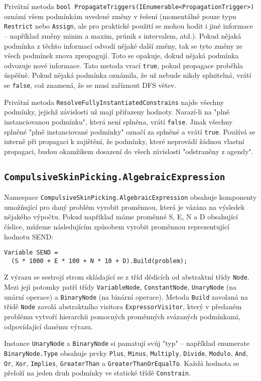 \documentclass[a4paper]{article}
\begin{document}
Privátní metoda \texttt{bool PropagateTriggers(IEnumerable<PropagationTrigger>)}
oznámí všem podmínkám uvedené změny v řešení (momentálně pouze typu
\texttt{Restrict} nebo \texttt{Assign}, ale pro praktické použití se mohou hodit
i jiné informace -- například změny minim a maxim, průnik s intervalem, atd.).
Pokud nějaká podmínka z těchto informací odvodí nějaké další změny, tak se tyto
změny ze všech podmínek znova zpropagují. Toto se opakuje, dokud nějaká podmínka
odvozuje nové informace.
Tato metoda vrací \texttt{true}, pokud propagace proběhla úspěšně. Pokud nějaká
podmínka oznámila, že už nebude nikdy splnitelná, vrátí se \texttt{false}, což
znamená, že se musí zaříznout DFS větev.

Privátní metoda \texttt{ResolveFullyInstantiatedConstrains} najde všechny
podmínky, jejichž závislosti už mají přiřazeny hodnoty. Narazí-li na "plně
instanciovanou podmínku", která není splněna, vrátí \texttt{false}. Jinak všechny
splněné "plně instanciované podmínky" označí za splněné a vrátí \texttt{true}.
Používá se interně při propagaci k zajištění, že podmínky, které neprovádí
žádnou vlastní propagaci, budou okamžikem dosazení do všech závislostí
"odstraněny z agendy".

\subsection{\texttt{CompulsiveSkinPicking.AlgebraicExpression}}
Namespace \texttt{CompulsiveSkinPicking.AlgebraicExpression} obsahuje komponenty
umožňující pro daný problém vyrobit proměnnou, která je vázána na výsledek
nějakého výpočtu.
Pokud například máme proměnné S, E, N a D obsahující číslice, můžeme
následujícím způsobem vyrobit proměnnou reprezentující hodnotu SEND:
\begin{lstlisting}
Variable SEND =
  (S * 1000 + E * 100 + N * 10 + D).Build(problem);
\end{lstlisting}

Z výrazu se sestrojí strom skládající se z tříd dědících od abstraktní třídy
\texttt{Node}. Mezi její potomky patří třídy \texttt{VariableNode},
\texttt{ConstantNode}, \texttt{UnaryNode} (na unární operace) a
\texttt{BinaryNode} (na binární operace). Metoda \texttt{Build} zavolaná na
třídě \texttt{Node} zavolá abstraktního visitora \texttt{ExpressorVisitor},
který v předaném problému vytvoří hierarchii pomocných proměnných svázaných
podmínkami, odpovídající danému výrazu.

Instance \texttt{UnaryNode} a \texttt{BinaryNode} si pamatují svůj "typ" --
například enumerate \texttt{BinaryNode.Type} obsahuje prvky \texttt{Plus},
\texttt{Minus}, \texttt{Multiply}, \texttt{Divide}, \texttt{Modulo},
\texttt{And}, \texttt{Or}, \texttt{Xor}, \texttt{Implies}, \texttt{GreaterThan}
a \texttt{GreaterThanOrEqualTo}. Každá hodnota se přeloží na jeden druh podmínky
ve statické třídě \texttt{Constrain}.
\end{document}
